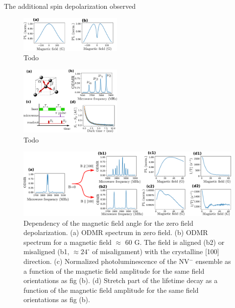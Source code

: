 \documentclass[preprintnumbers,amsmath,amssymb,superscriptaddress,twocolumn,showpacs]{revtex4-1}
\begin{document}
The additional spin depolarization observed 

\begin{figure}
\includegraphics[width=0.45\textwidth]{Figures/fig dense vs pas dense}
\caption{Todo}
\label{PL_NV_density}
\end{figure}

\begin{figure}
\includegraphics[width=0.45\textwidth]{Figures/fig T1}
\caption{Todo}
\label{T1}
\end{figure}

\begin{figure}
\includegraphics[width=.95\textwidth]{Figures/fig 100 vs 1x1x1x1}
\caption{Dependency of the magnetic field angle for the zero field depolarization. (a) ODMR spectrum in zero field. (b) ODMR spectrum for a magnetic field $\approx$ 60 G. The field is aligned (b2) or misaligned (b1, $\approx 24^\circ$ of misalignment) with the crystalline [100] direction. (c) Normalized photoluminescence of the NV$^-$ ensemble as a function of the magnetic field amplitude for the same field orientations as fig (b). (d) Stretch part of the lifetime decay as a function of the magnetic field amplitude for the same field orientations as fig (b).}
\label{100_VS_1x4}
\end{figure}
\end{document}
